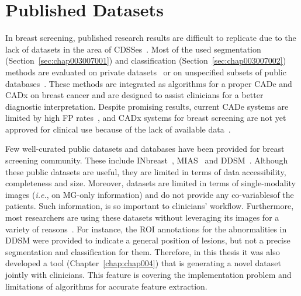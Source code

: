 \section{Published Datasets}
\label{sec:chap003008}

In breast screening, published research results are difficult to replicate due to the lack of datasets in the area of \acp{CDSSe}~\cite{lee2017curated}.
Most of the used segmentation (Section~\ref{sec:chap003007001}) and classification (Section~\ref{sec:chap003007002}) methods are evaluated on private datasets~\cite{SADAF2011457} or on unspecified subsets of public databases~\cite{https://doi.org/10.1118/1.4921612}.
These methods are integrated as algorithms for a proper \ac{CADe} and \ac{CADx} on breast cancer and are designed to assist clinicians for a better diagnostic interpretation.
Despite promising results, current \ac{CADe} systems are limited by high \ac{FP} rates~\cite{NISHIKAWA20141320}, and \ac{CADx} systems for breast screening are not yet approved for clinical use because of the lack of available data~\cite{10.1145/3079765}.

Few well-curated public datasets and databases have been provided for breast screening community.
These include INbreast~\cite{MOREIRA2012236}, \ac{MIAS}~\cite{7813261} and \ac{DDSM}~\cite{shen2019deep}.
Although these public datasets are useful, they are limited in terms of data accessibility, completeness and size.
Moreover, datasets are limited in terms of single-modality images ({\it i.e.}, on \ac{MG}-only information) and do not provide any co-variables\footnotemark[10] of the patients.
Such information, is so important to clinicians' workflow.
Furthermore, most researchers are using these datasets without leveraging its images for a variety of reasons~\cite{lee2017curated}.
For instance, the \ac{ROI} annotations for the abnormalities in \ac{DDSM} were provided to indicate a general position of lesions, but not a precise segmentation and classification for them.
Therefore, in this thesis it was also developed a tool (Chapter~\ref{chap:chap004}) that is generating a novel dataset jointly with clinicians.
This feature is covering the implementation problem and limitations of algorithms for accurate feature extraction.

